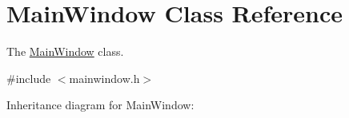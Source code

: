 \hypertarget{classMainWindow}{}\section{Main\+Window Class Reference}
\label{classMainWindow}


The \hyperlink{classMainWindow}{Main\+Window} class.  




{\ttfamily \#include $<$mainwindow.\+h$>$}



Inheritance diagram for Main\+Window\+:
